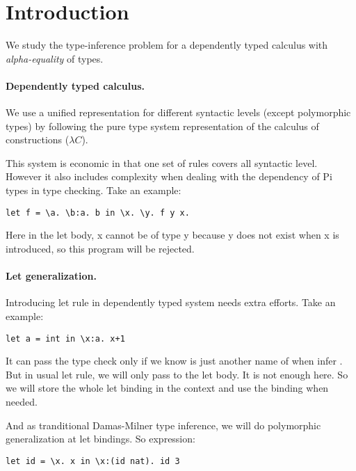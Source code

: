\section{Introduction}

We study the type-inference problem for a dependently
typed calculus with \emph{alpha-equality} of types.

\paragraph{Dependently typed calculus.} We use a unified
representation for different syntactic levels (except polymorphic
types) by following the pure type system representation of the
calculus of constructions ($\lambda C$).

This system is economic in that one set of rules covers all syntactic
level. However it also includes complexity when dealing with the
dependency of Pi types in type checking. Take an example:

\begin{lstlisting}
let f = \a. \b:a. b in \x. \y. f y x.
\end{lstlisting}

Here in the let body, \lst x cannot be of type \lst y because \lst y
does not exist when \lst x is introduced, so this program will be
rejected.

\paragraph{Let generalization.} Introducing let rule in dependently
typed system needs extra efforts. Take an example:

\begin{lstlisting}
let a = int in \x:a. x+1
\end{lstlisting}

It can pass the type check only if we know  is just another
name of  when infer . But in usual let rule, we will
only pass  to the let body. It is not enough here. So we will
store the whole let binding  in the context and use the
binding when needed.

And as tranditional Damas-Milner type inference, we will do
polymorphic generalization at let bindings. So expression:

\begin{lstlisting}
let id = \x. x in \x:(id nat). id 3
\end{lstlisting}

